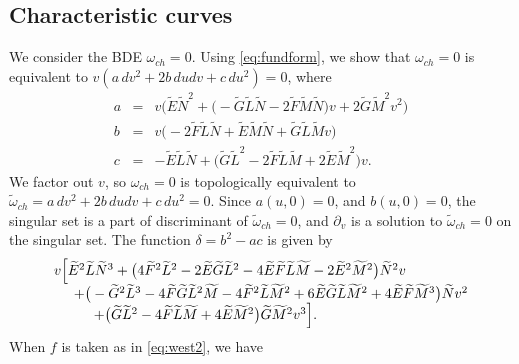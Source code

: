 \documentclass[a4paper, 12pt]{article}
\theoremstyle{definition}
\numberwithin{equation}{section}
\begin{document}
\subsection{Characteristic curves}
We consider the BDE $\omega_{ch}=0$.
Using \eqref{eq:fundform},
we show that $\omega_{ch}=0$ is equivalent to
$v(a\,dv^2+2b\,dudv+c\,du^2)=0$,
where
$$
\begin{array}{rcL}
a&=&
v \Big(\widetilde E \widetilde N^2 + 
   \big(-\widetilde G \widetilde L \widetilde N 
     - 2 \widetilde F \widetilde M \widetilde N\big)v
     + 2 \widetilde G \widetilde M^2 v^2\Big)\\
b&=&
 v \big(-2 \widetilde F \widetilde L \widetilde N 
     + \widetilde E \widetilde M \widetilde N 
     + \widetilde G \widetilde L \widetilde M v\big)\\
c&=&
-\widetilde E \widetilde L \widetilde N+
\big(\widetilde G \widetilde L^2 
- 2 \widetilde F \widetilde L\widetilde M
+2 \widetilde E\widetilde M^2
\big) v.
\end{array}
$$
We factor out $v$, so $\omega_{ch}=0$
is topologically equivalent to 
$\tilde\omega_{ch}=a\,dv^2+2b\,dudv+c\,du^2=0$.
Since
$ a(u,0)=0$, and
$ b(u,0)=0$,
the singular set is a part of discriminant of $\tilde\omega_{ch}=0$,
and $\partial_v$ is a solution to $\tilde\omega_{ch}=0$
on the singular set.
The function $\delta=b^2-ac$ is given by
$$
\begin{array}{l}
v\Big[\widetilde E^2 \widetilde L \widetilde N^3 
+\big(4 \widetilde F^2 \widetilde L^2 
-2 \widetilde E \widetilde G \widetilde L^2
-4 \widetilde E \widetilde F \widetilde L \widetilde M
-2 \widetilde E^2 \widetilde M^2\big) \widetilde N^2v \\
\hspace{5mm}
+
\big(
- \widetilde G^2 \widetilde L^3 
-4\widetilde F \widetilde G \widetilde L^2 \widetilde M
-4\widetilde F^2 \widetilde L \widetilde M^2
+6\widetilde E \widetilde G \widetilde L \widetilde M^2
+4\widetilde E \widetilde F \widetilde M^3\big) \widetilde Nv^2 \\
\hspace{10mm}
+
\big(
  \widetilde G \widetilde L^2
-4\widetilde F \widetilde L \widetilde M 
+4\widetilde E \widetilde M^2\big) \widetilde G \widetilde M^2v^3\Big].
\end{array}
$$
When $f$ is taken as in \eqref{eq:west2},
we have
\end{document}
